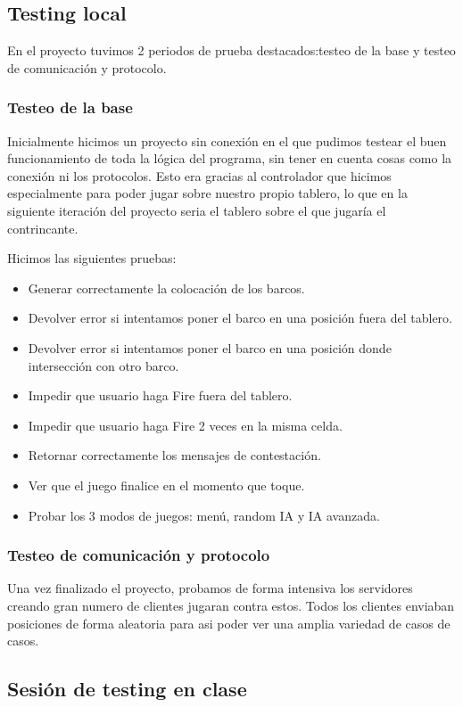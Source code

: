 \subsection{Testing local}
En el proyecto tuvimos 2 periodos de prueba destacados:testeo de la base y testeo de comunicación y protocolo.

\subsubsection*{Testeo de la base}
Inicialmente hicimos un proyecto sin conexión en el que pudimos testear el buen funcionamiento de  toda la lógica del programa, sin tener en cuenta cosas como la conexión ni los protocolos. Esto era gracias al controlador que hicimos especialmente para poder jugar sobre nuestro propio tablero, lo que en la siguiente iteración del proyecto seria el tablero sobre el que jugaría el contrincante.

Hicimos las siguientes pruebas:
\begin{itemize}
\item Generar correctamente la colocación de los barcos.
\item Devolver  error si intentamos poner el barco en una posición fuera del tablero.
\item Devolver  error si intentamos poner el barco en una posición donde intersección con otro barco.
\item Impedir que usuario haga Fire fuera del tablero.
\item Impedir que usuario haga Fire 2 veces en la misma celda.
\item Retornar correctamente los mensajes de contestación.
\item Ver que el juego finalice en el momento que toque.
\item Probar los 3 modos de juegos: menú, random IA y IA avanzada.
\end{itemize}

\subsubsection*{Testeo de comunicación y protocolo}

Una vez finalizado el proyecto, probamos de forma intensiva los servidores creando gran numero de  clientes jugaran contra estos. Todos los clientes enviaban posiciones de forma aleatoria para asi poder ver una amplia variedad de casos de casos.
\newpage
\subsection{Sesión de testing en clase}

